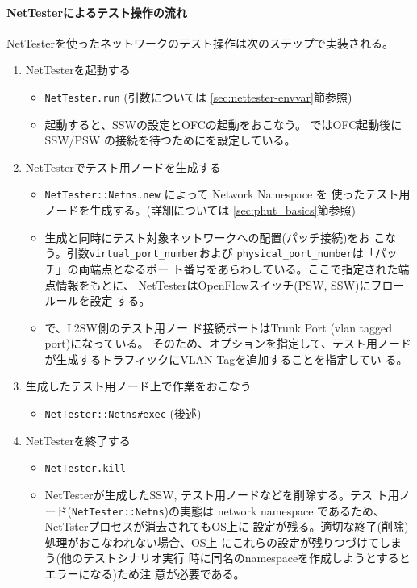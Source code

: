     \paragraph{NetTesterによるテスト操作の流れ}
NetTesterを使ったネットワークのテスト操作は次のステップで実装される。
\begin{enumerate}
 \item NetTesterを起動する
       \begin{itemize}
        \item \verb|NetTester.run| (引数については
              \ref{sec:nettester-envvar}節参照)
        \item 起動すると、SSWの設定とOFCの起動をおこなう。
              ではOFC起動後にSSW/PSW
              の接続を待つためにを設定している。
       \end{itemize}
 \item NetTesterでテスト用ノードを生成する
       \begin{itemize}
        \item \verb|NetTester::Netns.new| によって Network Namespace を
              使ったテスト用ノードを生成する。(詳細については
              \ref{sec:phut_basics}節参照)
        \item 生成と同時にテスト対象ネットワークへの配置(パッチ接続)をお
              こなう。引数\verb|virtual_port_number|および
              \verb|physical_port_number|は「パッチ」の両端点となるポー
              ト番号をあらわしている。ここで指定された端点情報をもとに、
              NetTesterはOpenFlowスイッチ(PSW, SSW)にフロールールを設定
              する。
        \item {}で、L2SW側のテスト用ノー
              ド接続ポートはTrunk Port (vlan tagged port)になっている。
              そのため、オプションを指定して、テスト用ノード
              が生成するトラフィックにVLAN Tagを追加することを指定してい
              る。
       \end{itemize}
 \item 生成したテスト用ノード上で作業をおこなう
       \begin{itemize}
        \item \verb|NetTester::Netns#exec| (後述)
       \end{itemize}
 \item NetTesterを終了する
       \begin{itemize}
        \item \verb|NetTester.kill|
        \item NetTesterが生成したSSW, テスト用ノードなどを削除する。テス
              ト用ノード(\verb|NetTester::Netns|)の実態は network
              namespace であるため、NetTsterプロセスが消去されてもOS上に
              設定が残る。適切な終了(削除)処理がおこなわれない場合、OS上
              にこれらの設定が残りつづけてしまう(他のテストシナリオ実行
              時に同名のnamespaceを作成しようとするとエラーになる)ため注
              意が必要である。
       \end{itemize}
\end{enumerate}

